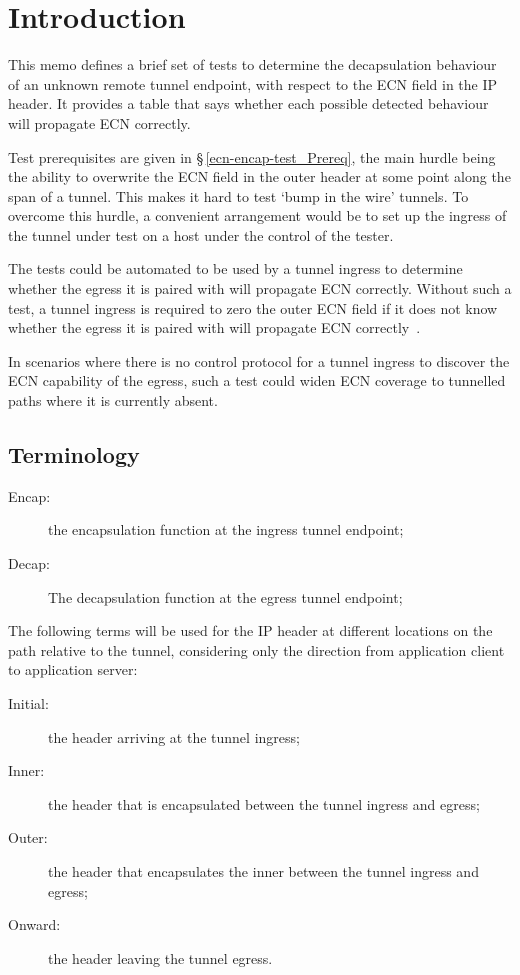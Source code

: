 \section{Introduction}\label{ecn-encap-test_Intr}

This memo defines a brief set of tests to determine the decapsulation behaviour of an unknown remote tunnel endpoint, with respect to the ECN field in the IP header. It provides a table that says whether each possible detected behaviour will propagate ECN correctly.

Test prerequisites are given in \S\,\ref{ecn-encap-test_Prereq}, the main hurdle being the ability to overwrite the ECN field in the outer header at some point along the span of a tunnel. This makes it hard to test `bump in the wire' tunnels. To overcome this hurdle, a convenient arrangement would be to set up the ingress of the tunnel under test on a host under the control of the tester. 

The tests could be automated to be used by a tunnel ingress to determine whether the egress it is paired with will propagate ECN correctly. Without such a test, a tunnel ingress is required to zero the outer ECN field if it does not know whether the egress it is paired with will propagate ECN correctly~\cite{Briscoe16b:ecn-tunnel-scope_ID}. 

In scenarios where there is no control protocol for a tunnel ingress to discover the ECN capability of the egress, such a test could widen ECN coverage to tunnelled paths where it is currently absent.

\subsection{Terminology}\label{ecn-encap-test_Term}

\begin{description}
	\item[Encap:] the encapsulation function at the ingress tunnel endpoint;
	\item[Decap:] The decapsulation function at the egress tunnel endpoint;
\end{description}

The following terms will be used for the IP header at different locations on the path relative to the tunnel, considering only the direction from application client to application server:
\begin{description}
	\item[Initial:] the header arriving at the tunnel ingress;
	\item[Inner:] the header that is encapsulated between the tunnel ingress and egress;
	\item[Outer:] the header that encapsulates the inner between the tunnel ingress and egress;
	\item[Onward:] the header leaving the tunnel egress.
\end{description}
